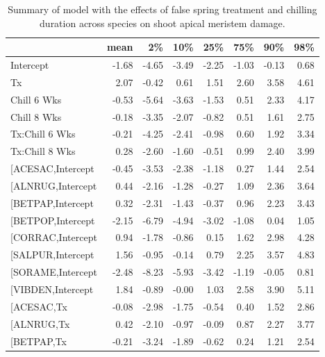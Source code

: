 \documentclass{article}\usepackage[]{graphicx}\usepackage[]{color}
\makeatletter
\newenvironment{kframe}{%
 \def\at@end@of@kframe{}%
 \ifinner\ifhmode%
  \def\at@end@of@kframe{\end{minipage}}%
  \begin{minipage}{\columnwidth}%
 \fi\fi%
 \def\FrameCommand##1{\hskip\@totalleftmargin \hskip-\fboxsep
 \colorbox{shadecolor}{##1}\hskip-\fboxsep
     \hskip-\linewidth \hskip-\@totalleftmargin \hskip\columnwidth}%
 \MakeFramed {\advance\hsize-\width
   \@totalleftmargin\z@ \linewidth\hsize
   \@setminipage}}%
 {\par\unskip\endMakeFramed%
 \at@end@of@kframe}
\makeatother
\begin{document}
\newpage
\begin{kframe}


{\ttfamily\noindent\bfseries\color{errorcolor}{\#\# Error in gsub("{}["{}, "{}"{}, modoutput\$term): invalid regular expression '[', reason 'Missing ']''}}\end{kframe}%
\begin{longtable}{lrrrrrrr}
\caption{Summary of model with the effects of false spring treatment and chilling duration across species on shoot apical meristem damage.} \\ 
  \hline
 & mean & 2\% & 10\% & 25\% & 75\% & 90\% & 98\% \\ 
  \hline \endhead  \hline
Intercept & -1.68 & -4.65 & -3.49 & -2.25 & -1.03 & -0.13 & 0.68 \\ 
  Tx & 2.07 & -0.42 & 0.61 & 1.51 & 2.60 & 3.58 & 4.61 \\ 
  Chill 6 Wks & -0.53 & -5.64 & -3.63 & -1.53 & 0.51 & 2.33 & 4.17 \\ 
  Chill 8 Wks & -0.18 & -3.35 & -2.07 & -0.82 & 0.51 & 1.61 & 2.75 \\ 
  Tx:Chill 6 Wks & -0.21 & -4.25 & -2.41 & -0.98 & 0.60 & 1.92 & 3.34 \\ 
  Tx:Chill 8 Wks & 0.28 & -2.60 & -1.60 & -0.51 & 0.99 & 2.40 & 3.99 \\ 
  [ACESAC,Intercept & -0.45 & -3.53 & -2.38 & -1.18 & 0.27 & 1.44 & 2.54 \\ 
  [ALNRUG,Intercept & 0.44 & -2.16 & -1.28 & -0.27 & 1.09 & 2.36 & 3.64 \\ 
  [BETPAP,Intercept & 0.32 & -2.31 & -1.43 & -0.37 & 0.96 & 2.23 & 3.43 \\ 
  [BETPOP,Intercept & -2.15 & -6.79 & -4.94 & -3.02 & -1.08 & 0.04 & 1.05 \\ 
  [CORRAC,Intercept & 0.94 & -1.78 & -0.86 & 0.15 & 1.62 & 2.98 & 4.28 \\ 
  [SALPUR,Intercept & 1.56 & -0.95 & -0.14 & 0.79 & 2.25 & 3.57 & 4.83 \\ 
  [SORAME,Intercept & -2.48 & -8.23 & -5.93 & -3.42 & -1.19 & -0.05 & 0.81 \\ 
  [VIBDEN,Intercept & 1.84 & -0.89 & -0.00 & 1.03 & 2.58 & 3.90 & 5.11 \\ 
  [ACESAC,Tx & -0.08 & -2.98 & -1.75 & -0.54 & 0.40 & 1.52 & 2.86 \\ 
  [ALNRUG,Tx & 0.42 & -2.10 & -0.97 & -0.09 & 0.87 & 2.27 & 3.77 \\ 
  [BETPAP,Tx & -0.21 & -3.24 & -1.89 & -0.62 & 0.24 & 1.21 & 2.54 \\ 

\end{longtable}
\end{document}
